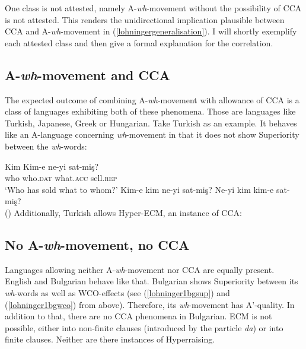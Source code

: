 \documentclass[output=paper,colorlinks,citecolor=brown]{langscibook}
\begin{document}
One class is not attested, namely A-\textit{wh}-movement without the possibility of CCA is not attested. This renders the unidirectional implication plausible between CCA and A-\textit{wh}-movement in (\ref{lohningergeneralisation}). I will shortly exemplify each attested class and then give a formal explanation for the correlation. 

\subsection{A-\textit{wh}-movement and CCA}
The expected outcome of combining A-\textit{wh}-movement with allowance of CCA is a class of languages exhibiting both of these phenomena. Those are languages like Turkish, Japanese, Greek or Hungarian. Take Turkish as an example. It behaves like an A-language concerning \textit{wh}-movement in that it does not show Superiority between the \textit{wh}-words:

\ea
\ea
\gll Kim Kim-e ne-yi sat-mi\c{s}?\\
who who.\textsc{dat} what.\textsc{acc} sell.\textsc{rep}\\
\glt `Who has sold what to whom?'
\ex Kim-e kim ne-yi sat-mi\c{s}?
\ex Ne-yi kim kim-e sat-mi\c{s}?\\
(\citealp[4]{ozsoy1996dependencies})
\z
\z
Additionally, Turkish allows Hyper-ECM, an instance of CCA:

\z

\subsection{No A-\textit{wh}-movement, no CCA}
Languages allowing neither A-\textit{wh}-movement nor CCA are equally present. English and Bulgarian behave like that. Bulgarian shows Superiority between its \textit{wh}-words as well as WCO-effects (see (\ref{lohninger1bgsup}) and (\ref{lohninger1bgwco}) from above). Therefore, its \textit{wh}-movement has A'-quality. In addition to that, there are no CCA phenomena in Bulgarian. ECM is not possible, either into non-finite clauses (introduced by the particle \textit{da}) or into finite clauses. Neither are there instances of Hyperraising.
\end{document}
